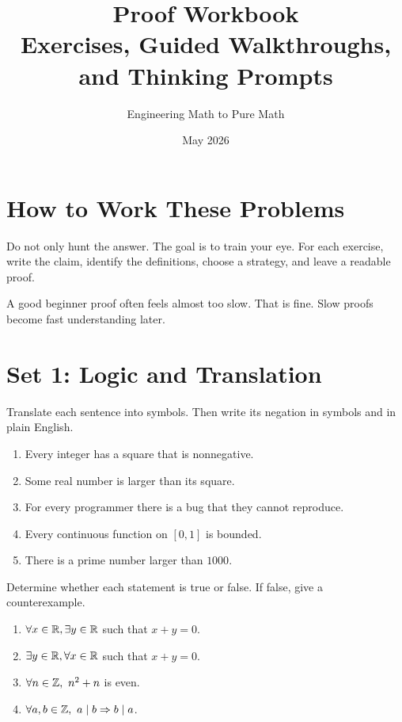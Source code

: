 \documentclass[11pt]{article}
\title{\textbf{Proof Workbook}\\Exercises, Guided Walkthroughs, and Thinking Prompts}
\author{Engineering Math to Pure Math}
\date{May 2026}
\begin{document}
\maketitle
\tableofcontents
\newpage

\section{How to Work These Problems}

Do not only hunt the answer. The goal is to train your eye. For each exercise, write the claim, identify the definitions, choose a strategy, and leave a readable proof.

\begin{focusbox}
A good beginner proof often feels almost too slow. That is fine. Slow proofs become fast understanding later.
\end{focusbox}

\section{Set 1: Logic and Translation}

\begin{exercise}
Translate each sentence into symbols. Then write its negation in symbols and in plain English.
\begin{enumerate}
\item Every integer has a square that is nonnegative.
\item Some real number is larger than its square.
\item For every programmer there is a bug that they cannot reproduce.
\item Every continuous function on $[0,1]$ is bounded.
\item There is a prime number larger than $1000$.
\end{enumerate}
\end{exercise}

\begin{exercise}
Determine whether each statement is true or false. If false, give a counterexample.
\begin{enumerate}
\item $\forall x\in\mathbb{R},\exists y\in\mathbb{R}$ such that $x+y=0$.
\item $\exists y\in\mathbb{R},\forall x\in\mathbb{R}$ such that $x+y=0$.
\item $\forall n\in\mathbb{Z},\ n^2+n$ is even.
\item $\forall a,b\in\mathbb{Z},\ a\mid b\Rightarrow b\mid a$.
\end{enumerate}
\end{exercise}
\end{document}
